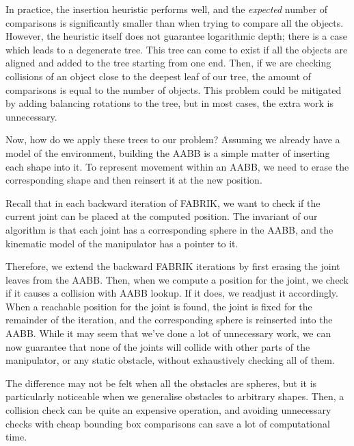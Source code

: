 In practice, the insertion heuristic performs well, and the \textit{expected} number of comparisons is significantly smaller than when trying to compare all the objects. However, the heuristic itself does not guarantee logarithmic depth; there is a case which leads to a degenerate tree. This tree can come to exist if all the objects are aligned and added to the tree starting from one end. Then, if we are checking collisions of an object close to the deepest leaf of our tree, the amount of comparisons is equal to the number of objects. This problem could be mitigated by adding balancing rotations to the tree, but in most cases, the extra work is unnecessary.

Now, how do we apply these trees to our problem? Assuming we already have a model of the environment, building the AABB is a simple matter of inserting each shape into it. To represent movement within an AABB, we need to erase the corresponding shape and then reinsert it at the new position.

Recall that in each backward iteration of FABRIK, we want to check if the current joint can be placed at the computed position. The invariant of our algorithm is that each joint has a corresponding sphere in the AABB, and the kinematic model of the manipulator has a pointer to it.

Therefore, we extend the backward FABRIK iterations by first erasing the joint leaves from the AABB. Then, when we compute a position for the joint, we check if it causes a collision with AABB lookup. If it does, we readjust it accordingly. When a reachable position for the joint is found, the joint is fixed for the remainder of the iteration, and the corresponding sphere is reinserted into the AABB. While it may seem that we've done a lot of unnecessary work, we can now guarantee that none of the joints will collide with other parts of the manipulator, or any static obstacle, without exhaustively checking all of them.

The difference may not be felt when all the obstacles are spheres, but it is particularly noticeable when we generalise obstacles to arbitrary shapes. Then, a collision check can be quite an expensive operation, and avoiding unnecessary checks with cheap bounding box comparisons can save a lot of computational time.
